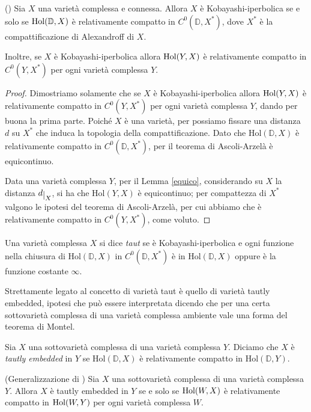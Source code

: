 \begin{prop} \label{alex}
    (\cite[Theorem 1.3]{A5}) Sia $X$ una varietà complessa e connessa. Allora $X$ è Kobayashi-iperbolica se e solo se $\textnormal{Hol}(\mathbb{D},X)$ è relativamente compatto in $C^0(\mathbb{D},X^*)$, dove $X^*$ è la compattificazione di Alexandroff di $X$.
    
    Inoltre, se $X$ è Kobayashi-iperbolica allora $\textnormal{Hol}(Y,X)$ è relativamente compatto in $C^0(Y,X^*)$ per ogni varietà complessa $Y$.
\end{prop}

\begin{proof}
    Dimostriamo solamente che se $X$ è Kobayashi-iperbolica allora $\textnormal{Hol}(Y,X)$ è relativamente compatto in $C^0(Y,X^*)$ per ogni varietà complessa $Y$, dando per buona la prima parte. Poiché $X$ è una varietà, per \cite[4.16]{Ke} possiamo fissare una distanza $d$ su $X^*$ che induca la topologia della compattificazione. Dato che $\text{Hol}(\mathbb{D},X)$ è relativamente compatto in $C^0(\mathbb{D},X^*)$, per il teorema di Ascoli-Arzelà è equicontinuo.
    
    Data una varietà complessa $Y$, per il Lemma \ref{equico}, considerando su $X$ la distanza $d\restrict{X}$, si ha che $\text{Hol}(Y,X)$ è equicontinuo; per compattezza di $X^*$ valgono le ipotesi del teorema di Ascoli-Arzelà, per cui abbiamo che è relativamente compatto in $C^0(Y,X^*)$, come voluto.
\end{proof}

\begin{defn}
    Una varietà complessa $X$ si dice \textit{taut} se è Kobayashi-iperbolica e ogni funzione nella chiusura di $\text{Hol}(\mathbb{D},X)$ in $C^0(\mathbb{D},X^*)$ è in $\text{Hol}(\mathbb{D},X)$ oppure è la funzione costante $\infty$.
\end{defn}

Strettamente legato al concetto di varietà taut è quello di varietà tautly embedded, ipotesi che può essere interpretata dicendo che per una certa sottovarietà complessa di una varietà complessa ambiente vale una forma del teorema di Montel.

\begin{defn}
    Sia $X$ una sottovarietà complessa di una varietà complessa $Y$. Diciamo che $X$ è \textit{tautly embedded} in $Y$ se $\text{Hol}(\mathbb{D},X)$ è relativamente compatto in $\text{Hol}(\mathbb{D},Y)$.
\end{defn}

\begin{prop} \label{montel}
    (Generalizzazione di \cite[Theorem 1]{Ki2}) Sia $X$ una sottovarietà complessa di una varietà complessa $Y$. Allora $X$ è tautly embedded in $Y$ se e solo se $\textnormal{Hol}(W,X)$ è relativamente compatto in $\textnormal{Hol}(W,Y)$ per ogni varietà complessa $W$.
\end{prop}

